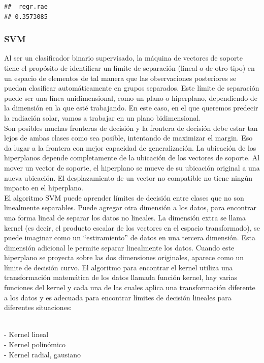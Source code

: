 \documentclass[
  11pt,
  a4paper,
]{article}
\begin{document}
\begin{verbatim}
##  regr.rae 
## 0.3573085
\end{verbatim}

\subsubsection{SVM}

Al ser un clasificador binario supervisado, la máquina de vectores de
soporte tiene el propósito de identificar un límite de separación
(lineal o de otro tipo) en un espacio de elementos de tal manera que las
observaciones posteriores se puedan clasificar automáticamente en grupos
separados. Este límite de separación puede ser una línea unidimensional,
como un plano o hiperplano, dependiendo de la dimensión en la que esté
trabajando. En este caso, en el que queremos predecir la radiación
solar, vamos a trabajar en un plano bidimensional.\\
Son posibles muchas fronteras de decisión y la frontera de decisión debe
estar tan lejos de ambas clases como sea posible, intentando de
maximizar el margin. Eso da lugar a la frontera con mejor capacidad de
generalización. La ubicación de los hiperplanos depende completamente de
la ubicación de los vectores de soporte. Al mover un vector de soporte,
el hiperplano se mueve de su ubicación original a una nueva ubicación.
El desplazamiento de un vector no compatible no tiene ningún impacto en
el hiperplano.\\
El algoritmo SVM puede aprender límites de decisión entre clases que no
son linealmente separables. Puede agregar otra dimensión a los datos,
para encontrar una forma lineal de separar los datos no lineales. La
dimensión extra se llama kernel (es decir, el producto escalar de los
vectores en el espacio transformado), se puede imaginar como un
``estiramiento'' de datos en una tercera dimensión. Esta dimensión
adicional le permite separar linealmente los datos. Cuando este
hiperplano se proyecta sobre las dos dimensiones originales, aparece
como un límite de decisión curvo. El algoritmo para encontrar el kernel
utiliza una transformación matemática de los datos llamada función
kernel, hay varias funciones del kernel y cada una de las cuales aplica
una transformación diferente a los datos y es adecuada para encontrar
límites de decisión lineales para diferentes situaciones:\\
\strut \\
- Kernel lineal\\
- Kernel polinómico\\
- Kernel radial, gausiano\\
\end{document}
